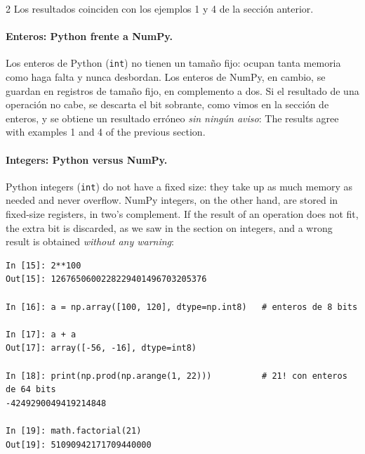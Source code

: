\begin{paracol}{2}
Los resultados coinciden con los ejemplos 1 y 4 de la sección anterior.

\paragraph{Enteros: Python frente a NumPy.} Los enteros de Python (\texttt{int}) no tienen un tamaño fijo: ocupan tanta memoria como haga falta y nunca desbordan. Los enteros de NumPy, en cambio, se guardan en registros de tamaño fijo, en complemento a dos. Si el resultado de una operación no cabe, se descarta el bit sobrante, como vimos en la sección de enteros, y se obtiene un resultado erróneo \emph{sin ningún aviso}:
\switchcolumn
The results agree with examples 1 and 4 of the previous section.

\paragraph{Integers: Python versus NumPy.} Python integers (\texttt{int}) do not have a fixed size: they take up as much memory as needed and never overflow. NumPy integers, on the other hand, are stored in fixed-size registers, in two's complement. If the result of an operation does not fit, the extra bit is discarded, as we saw in the section on integers, and a wrong result is obtained \emph{without any warning}:
\end{paracol}
\begin{verbatim}
In [15]: 2**100
Out[15]: 1267650600228229401496703205376

In [16]: a = np.array([100, 120], dtype=np.int8)   # enteros de 8 bits

In [17]: a + a
Out[17]: array([-56, -16], dtype=int8)

In [18]: print(np.prod(np.arange(1, 22)))          # 21! con enteros de 64 bits
-4249290049419214848

In [19]: math.factorial(21)
Out[19]: 51090942171709440000
\end{verbatim}
